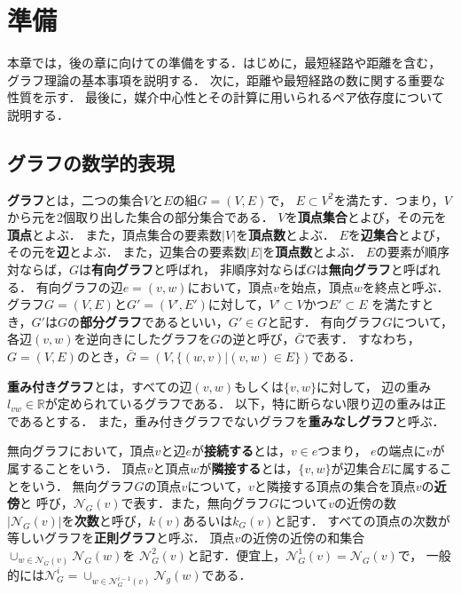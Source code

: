 \chapter{準備}
\label{chap:preliminary}
本章では，後の章に向けての準備をする．はじめに，最短経路や距離を含む，
グラフ理論の基本事項を説明する．
次に，距離や最短経路の数に関する重要な性質を示す．
最後に，媒介中心性とその計算に用いられるペア依存度について説明する．

\section{グラフの数学的表現}
\label{sect:graph-theory}

\textbf{グラフ}とは，二つの集合$V$と$E$の組$G=(V,E)$で，
$E\subset V^2$を満たす．つまり，$V$から元を2個取り出した集合の部分集合である．
$V$を\textbf{頂点集合}とよび，その元を\textbf{頂点}とよぶ．
また，頂点集合の要素数$|V|$を\textbf{頂点数}とよぶ．
$E$を\textbf{辺集合}とよび，その元を\textbf{辺}とよぶ．
また，辺集合の要素数$|E|$を\textbf{頂点数}とよぶ．
$E$の要素が順序対ならば，$G$は\textbf{有向グラフ}と呼ばれ，
非順序対ならば$G$は\textbf{無向グラフ}と呼ばれる．
有向グラフの辺$e=(v,w)$において，頂点$v$を始点，頂点$w$を終点と呼ぶ．
グラフ$G=(V,E)$と$G'=(V',E')$に対して，$V'\subset V$かつ$E'\subset E$
を満たすとき，$G'$は$G$の\textbf{部分グラフ}であるといい，$G'\in G$と記す．
有向グラフ$G$について，各辺$(v,w)$を逆向きにしたグラフを$G$の逆と呼び，$\bar{G}$で表す．
すなわち，$G=(V,E)$のとき，$\bar{G}=(V,\{(w,v)|(v,w)\in E\})$である．

\textbf{重み付きグラフ}とは，すべての辺$(v,w)$もしくは$\{v,w\}$に対して，
辺の重み$l_{vw}\in\mathbb{R}$が定められているグラフである．
以下，特に断らない限り辺の重みは正であるとする．
また，重み付きグラフでないグラフを\textbf{重みなしグラフ}と呼ぶ．

無向グラフにおいて，頂点$v$と辺$e$が\textbf{接続する}とは，$v\in e$つまり，
$e$の端点に$v$が属することをいう．
頂点$v$と頂点$w$が\textbf{隣接する}とは，$\{v,w\}$が辺集合$E$に属することをいう．
無向グラフ$G$の頂点$v$について，$v$と隣接する頂点の集合を頂点$v$の\textbf{近傍}と
呼び，$\mathcal{N}_G(v)$で表す．また，無向グラフ$G$について$v$の近傍の数
$|\mathcal{N}_G(v)|$を\textbf{次数}と呼び，$k(v)$あるいは$k_G(v)$と記す．
すべての頂点の次数が等しいグラフを\textbf{正則グラフ}と呼ぶ．
頂点$v$の近傍の近傍の和集合$\cup_{w\in\mathcal{N}_G(v)}\mathcal{N}_G(w)$を
$\mathcal{N}_G^2(v)$と記す．便宜上，$\mathcal{N}_G^1(v)=\mathcal{N}_G(v)$で，
一般的には$\mathcal{N}_G^i=\cup_{w\in\mathcal{N}_G^{i-1}(v)}\mathcal{N}_g(w)$である．

